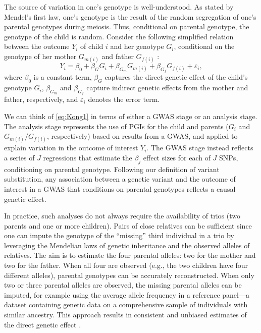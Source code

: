 \documentclass[12pt,a4paper]{article}
\begin{document}
\begin{bibunit}
The source of variation in one's genotype is well-understood. As stated by Mendel's first law, one's genotype is the result of the random segregation of one's parental genotypes during meiosis. Thus, conditional on parental genotype, the genotype of the child is random. 
Consider the following simplified relation between the outcome $Y_i$ of child $i$ and her genotype $G_i$, conditional on the genotype of her mother $G_{m(i)}$ and father $G_{f(i)}$ \citep{kong2020family}:
\begin{equation}
Y_i = \beta_0 + \beta_G G_i + \beta_{G_m} G_{m(i)} + \beta_{G_f}G_{f(i)} + \varepsilon_i,
\label{eq:Kong1}
\end{equation}
where $\beta_0$ is a constant term, $\beta_G$ captures the direct genetic effect of the child's genotype $G_i$, $\beta_{G_m}$ and $\beta_{G_f}$ capture indirect genetic effects from the mother and father, respectively, and $\varepsilon_i$ denotes the error term.

We can think of \autoref{eq:Kong1} in terms of either a GWAS stage or an analysis stage. The analysis stage represents the use of PGIs for the child and parents ($G_i$ and $G_{m(i)}/G_{f(i)}$, respectively) based on results from a GWAS, and applied to explain variation in the outcome of interest $Y_i$. The GWAS stage instead reflects a series of $J$ regressions that estimate the $\beta_j$ effect sizes for each of $J$ SNPs, conditioning on parental genotype.  Following our definition of variant substitution, any association between a genetic variant and the outcome of interest in a GWAS that conditions on parental genotypes reflects a causal genetic effect.%

In practice, such analyses do not always require the availability of trios (two parents and one or more children). Pairs of close relatives can be sufficient since one can impute the genotype of the ``missing'' third individual in a trio \citep{kong2020family,young2022mendelian} by leveraging the Mendelian laws of genetic inheritance and the observed alleles of relatives. The aim is to estimate the four parental alleles: two for the mother and two for the father. When all four are observed (e.g., the two children have four different alleles),  parental genotypes can be accurately reconstructed. When only two or three parental alleles are observed, the missing parental alleles can be imputed, for example using the average allele frequency in a reference panel---a dataset containing genetic data on a comprehensive sample of individuals with similar ancestry. This approach results in consistent and unbiased estimates of the direct genetic effect \citep[for a detailed proof, see][]{young2022mendelian}. 


\end{bibunit}
\end{document}
